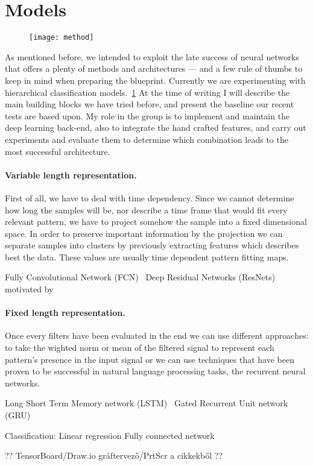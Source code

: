 \section{Models}
\begin{figure}[h]
  \centering
  \texttt{[image: method]}\label{fig:method}
\end{figure}

As mentioned before, we intended to exploit the late success of neural networks that offers a plenty of methods and architectures --- and a few rule of thumbs to keep in mind when preparing the blueprint.
Currently we are experimenting with hierarchical classification models.~\ref{fig:method}
At the time of writing I will describe the main building blocks we have tried before, and present the baseline our recent tests are based upon.
My role in the group is to implement and maintain the deep learning back-end, also to integrate the hand crafted features, and carry out experiments and evaluate them to determine which combination leads to the most successful architecture.

\paragraph{Variable length representation.}
First of all, we have to deal with time dependency. Since we cannot determine how long the samples will be, nor describe a time frame that would fit every relevant pattern, we have to project somehow the sample into a fixed dimensional space. In order to preserve important information by the projection we can separate samples into clusters by previously extracting features which describes best the data. These values are usually time dependent pattern fitting maps.

Fully Convolutional Network (FCN)~\cite{lecun1995convolutional, mittelman2015time}
Deep Residual Networks (ResNets) motivated by~\cite{he2016deep, wang2016time}

\paragraph{Fixed length representation.}
Once every filters have been evaluated in the end we can use different approaches: to take the wighted norm or mean of the filtered signal to represent each pattern's presence in the input signal or we can use techniques that have been proven to be successful in natural language processing tasks, the recurrent neural networks.

Long Short Term Memory network (LSTM)~\cite{hochreiter1997long, malhotra2015long}
Gated Recurrent Unit network (GRU)~\cite{chung2014empirical}

Classification:
Linear regression
Fully connected network~\cite{girshick2014rich}

?? TensorBoard/Draw.io gráftervező/PrtScr a cikkekből ??
